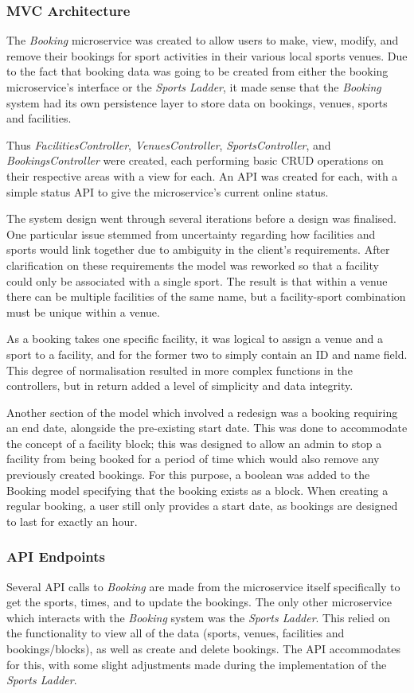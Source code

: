 \subsubsection{MVC Architecture}
\par
The \textit{Booking} microservice was created to allow users to make, view, modify, and remove their bookings for sport activities in their various local sports venues. Due to the fact that booking data was going to be created from either the booking microservice's interface or the \textit{Sports Ladder}, it made sense that the \textit{Booking} system had its own persistence layer to store data on bookings, venues, sports and facilities. 
\par
Thus \textit{FacilitiesController}, \textit{VenuesController}, \textit{SportsController},  and \textit{BookingsController} were created, each performing basic CRUD operations on their respective areas with a view for each. An API was created for each, with a simple status API to give the microservice's current online status. 
\par 
The system design went through several iterations before a design was finalised. One particular issue stemmed from uncertainty regarding how facilities and sports would link together due to ambiguity in the client's requirements. After clarification on these requirements the model was reworked so that a facility could only be associated with a single sport. The result is that within a venue there can be multiple facilities of the same name, but a facility-sport combination must be unique within a venue. 
\par 
As a booking takes one specific facility, it was logical to assign a venue and a sport to a facility, and for the former two to simply contain an ID and name field. This degree of normalisation resulted in more complex functions in the controllers, but in return added a level of simplicity and data integrity. 
\par
Another section of the model which involved a redesign was a booking requiring an end date, alongside the pre-existing start date. This was done to accommodate the concept of a facility block; this was designed to allow an admin to stop a facility from being booked for a period of time which would also remove any previously created bookings. For this purpose, a boolean was added to the Booking model specifying that the booking exists as a block. When creating a regular booking, a user still only provides a start date, as bookings are designed to last for exactly an hour. 
\subsubsection{API Endpoints}
\par 
Several API calls to \textit{Booking} are made from the microservice itself specifically to get the sports, times, and to update the bookings. The only other microservice which interacts with the \textit{Booking} system was the \textit{Sports Ladder}. This relied on the functionality to view all of the data (sports, venues, facilities and bookings/blocks), as well as create and delete bookings. The API accommodates for this, with some slight adjustments made during the implementation of the \textit{Sports Ladder}. 

